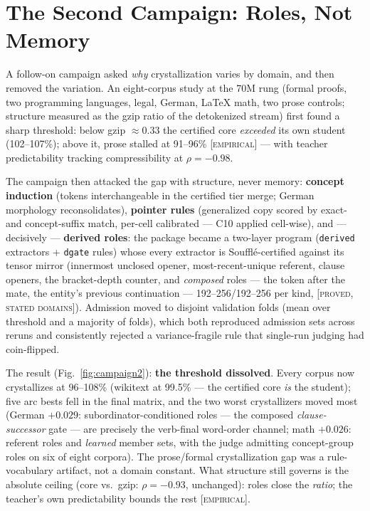 \documentclass[sigconf,nonacm]{acmart}
\newcommand{\code}[1]{\texttt{#1}}
\newcommand{\tagp}[1]{\textsc{\small[#1]}}
\begin{document}
\section{The Second Campaign: Roles, Not Memory}
\label{sec:campaign2}

A follow-on campaign asked \emph{why} crystallization varies by domain, and then removed the
variation. An eight-corpus study at the 70M rung (formal proofs, two programming languages,
legal, German, LaTeX math, two prose controls; structure measured as the gzip ratio of the
detokenized stream) first found a sharp threshold: below gzip $\approx 0.33$ the certified core
\emph{exceeded} its own student (102--107\%); above it, prose stalled at 91--96\%
\tagp{empirical} --- with teacher predictability tracking compressibility at $\rho=-0.98$.

The campaign then attacked the gap with structure, never memory: \textbf{concept induction}
(tokens interchangeable in the certified tier merge; German morphology reconsolidates),
\textbf{pointer rules} (generalized copy scored by exact- and concept-suffix match, per-cell
calibrated --- C10 applied cell-wise), and --- decisively --- \textbf{derived roles}: the package
became a two-layer program (\code{derived} extractors + \code{dgate} rules) whose every
extractor is Souffl\'e-certified against its tensor mirror (innermost unclosed opener,
most-recent-unique referent, clause openers, the bracket-depth counter, and \emph{composed}
roles --- the token after the mate, the entity's previous continuation --- 192--256/192--256 per
kind, \tagp{proved, stated domains}). Admission moved to disjoint validation folds (mean over
threshold and a majority of folds), which both reproduced admission sets across reruns and
consistently rejected a variance-fragile rule that single-run judging had coin-flipped.

The result (Fig.~\ref{fig:campaign2}): \textbf{the threshold dissolved}. Every corpus now
crystallizes at 96--108\% (wikitext at 99.5\% --- the certified core \emph{is} the student);
five arc bests fell in the final matrix, and the two worst crystallizers moved most (German
$+0.029$: subordinator-conditioned roles --- the composed \emph{clause-successor} gate --- are
precisely the verb-final word-order channel; math $+0.026$: referent roles and \emph{learned}
member sets, with the judge admitting concept-group roles on six of eight corpora). The
prose/formal crystallization gap was a rule-vocabulary artifact, not a domain constant. What
structure still governs is the absolute ceiling (core vs.\ gzip: $\rho=-0.93$, unchanged):
roles close the \emph{ratio}; the teacher's own predictability bounds the rest \tagp{empirical}.
\end{document}
